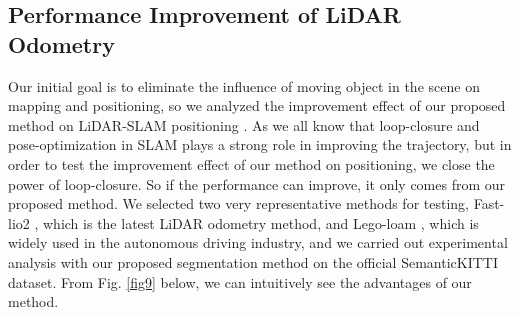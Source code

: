 \documentclass[lettersize,journal]{IEEEtran}
\begin{document}
\subsection{Performance Improvement of LiDAR Odometry}
Our initial goal is to eliminate the influence of moving object in the scene on mapping and positioning, so we analyzed the improvement effect of our proposed method on LiDAR-SLAM positioning \cite{you2018joint}. As we all know that loop-closure and pose-optimization in SLAM plays a strong role in improving the trajectory, but in order to test the improvement effect of our method on positioning, we close the power of loop-closure. So if the performance can improve, it only comes from our proposed method. We selected two very representative methods for testing, Fast-lio2 \cite{xu2022fast}, which is the latest LiDAR odometry method, and Lego-loam \cite{shan2018lego}, which is widely used in the autonomous driving industry, and we carried out experimental analysis with our proposed segmentation method on the official SemanticKITTI dataset. From Fig. \ref{fig9} below, we can intuitively see the advantages of our method.
\end{document}
